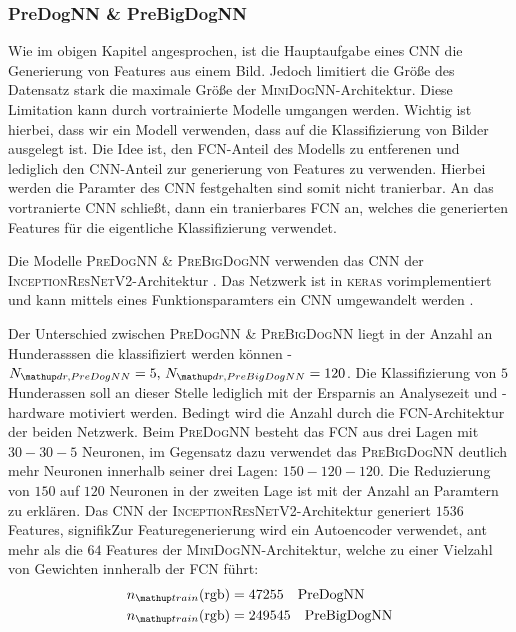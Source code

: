 \subsubsection{PreDogNN \& PreBigDogNN}
Wie im obigen Kapitel angesprochen, ist die Hauptaufgabe eines CNN die Generierung
von Features aus einem Bild. Jedoch limitiert die Größe des Datensatz stark
die maximale Größe der \textsc{MiniDogNN}-Architektur. Diese Limitation
kann durch vortrainierte Modelle umgangen werden. Wichtig ist hierbei, dass wir
ein Modell verwenden, dass auf die Klassifizierung von Bilder ausgelegt ist.
Die Idee ist, den FCN-Anteil des Modells zu entferenen und lediglich den CNN-Anteil
zur generierung von Features zu verwenden. Hierbei werden die Paramter des CNN
festgehalten sind somit nicht tranierbar. An das vortranierte CNN schließt, dann
ein tranierbares FCN an, welches die generierten Features für die eigentliche
Klassifizierung verwendet.

Die Modelle \textsc{PreDogNN \& PreBigDogNN} verwenden das CNN der
\textsc{InceptionResNetV2}-Architektur \cite{InceptionResNetV2}. Das Netzwerk
ist in \textsc{keras} vorimplementiert und kann mittels eines Funktionsparamters
ein CNN umgewandelt werden \cite{keras_InceptionResNetV2}.

Der Unterschied zwischen \textsc{PreDogNN \& PreBigDogNN} liegt in der Anzahl
an Hunderasssen die klassifiziert werden können -
$N\ua{dr, PreDogNN}=5,\, N\ua{dr, PreBigDogNN}=120$. Die Klassifizierung von $5$ Hunderassen
soll an dieser Stelle lediglich mit der Ersparnis an Analysezeit und -hardware
motiviert werden. Bedingt wird die Anzahl durch die FCN-Architektur der beiden
Netzwerk. Beim \textsc{PreDogNN} besteht das FCN aus drei Lagen mit $30-30-5$
Neuronen, im Gegensatz dazu verwendet das \textsc{PreBigDogNN} deutlich
mehr Neuronen innerhalb seiner drei Lagen: $150-120-120$. Die Reduzierung von
$150$ auf $120$ Neuronen in der zweiten Lage ist mit der Anzahl an Paramtern
zu erklären. Das CNN der \textsc{InceptionResNetV2}-Architektur generiert
$1536$ Features, signifikZur Featuregenerierung wird ein Autoencoder verwendet, ant mehr als die $64$ Features der \textsc{MiniDogNN}-Architektur, welche zu einer Vielzahl von Gewichten innheralb der FCN führt:
\begin{align}
  \begin{aligned}
  \label{eq:ntrain_PreDogNN_PreBigDogNN}
  n\ua{train}(\mathrm{rgb}) &= 47255 \quad \mathrm{PreDogNN} \\
  n\ua{train}(\mathrm{rgb}) &= 249545 \quad \mathrm{PreBigDogNN}
\end{aligned}
\end{align}

